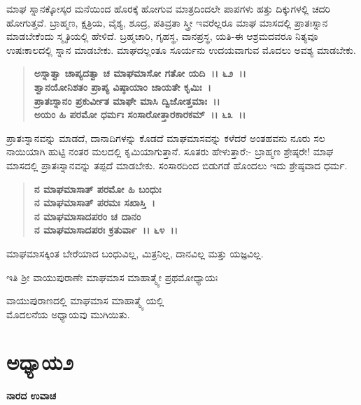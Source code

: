 ಮಾಘ ಸ್ನಾನಕ್ಕೋಸ್ಕರ ಮನೆಯಿಂದ ಹೊರಕ್ಕೆ ಹೋಗುವ ಮಾತ್ರದಿಂದಲೇ ಪಾಪಗಳು ಹತ್ತು ದಿಕ್ಕುಗಳಲ್ಲಿ ಚದರಿ ಹೋಗುತ್ತವೆ. ಬ್ರಾಹ್ಮಣ, ಕ್ಷತ್ರಿಯ, ವೈಶ್ಯ, ಶೂದ್ರ, ಪತಿವ್ರತಾ ಸ್ತ್ರೀ ಇವರೆಲ್ಲರೂ ಮಾಘ ಮಾಸದಲ್ಲಿ ಪ್ರಾತಃಸ್ನಾನ ಮಾಡಬೇಕೆಂದು ಸ್ಮೃತಿಯಲ್ಲಿ ಹೇಳಿದೆ. ಬ್ರಹ್ಮಚಾರಿ, ಗೃಹಸ್ಥ, ವಾನಪ್ರಸ್ಥ, ಯತಿ-ಈ ಆಶ್ರಮದವರೂ ನಿತ್ಯವೂ ಉಷಃಕಾಲದಲ್ಲಿ ಸ್ನಾನ ಮಾಡಬೇಕು. ಮಾಘದಲ್ಲಂತೂ ಸೂರ್ಯನು ಉದಯವಾಗುವ ಮೊದಲು ಅವಶ್ಯ ಮಾಡಬೇಕು.

\begin{verse}
\textbf{ಅಸ್ನಾತ್ವಾ ಚಾಪ್ಯದತ್ವಾ ಚ ಮಾಘಮಾಸೋ ಗತೋ ಯದಿ~।। ೬೨~।।}\\\textbf{ಶ್ವಾನಯೋನಿಶತಂ ಪ್ರಾಪ್ಯ ವಿಷ್ಠಾಯಾಂ ಜಾಯತೇ ಕೃಮಿಃ~।}\\\textbf{ಪ್ರಾತಃಸ್ನಾನಂ ಪ್ರಕುರ್ವೀತ ಮಾಘೇ ಮಾಸಿ ದ್ವಿಜೋತ್ತಮಾಃ~।।} \\\textbf{ಅಯಂ ಹಿ ಪರಮೋ ಧರ್ಮಃ ಸಂಸಾರೋತ್ತಾರಕಾರಕಮ್~।। ೬೩~।।}
\end{verse}

ಪ್ರಾತಃಸ್ನಾನವನ್ನು ಮಾಡದೆ, ದಾನಾದಿಗಳನ್ನು ಕೊಡದೆ ಮಾಘಮಾಸವನ್ನು ಕಳೆದರೆ ಅಂತಹವನು ನೂರು ಸಲ ನಾಯಿಯಾಗಿ ಹುಟ್ಟಿ ನಂತರ ಮಲದಲ್ಲಿ ಕೃಮಿಯಾಗುತ್ತಾನೆ. ಸೂತರು ಹೇಳುತ್ತಾರೆ:- ಬ್ರಾಹ್ಮಣ ಶ್ರೇಷ್ಠರೇ! ಮಾಘ ಮಾಸದಲ್ಲಿ ಪ್ರಾತಃಸ್ನಾನವನ್ನು ತಪ್ಪದೆ ಮಾಡಬೇಕು. ಸಂಸಾರದಿಂದ ಬಿಡುಗಡೆ ಹೊಂದಲು ಇದು ಶ್ರೇಷ್ಠವಾದ ಧರ್ಮ.

\begin{verse}
\textbf{ನ ಮಾಘಮಾಸಾತ್ ಪರಮೋ ಹಿ ಬಂಧುಃ}\\\textbf{ನ ಮಾಘಮಾಸಾತ್ ಪರಮಃ ಸಖಾಸ್ತಿ~।}\\\textbf{ನ ಮಾಘಮಾಸಾದಪರಂ ಚ ದಾನಂ} \\\textbf{ನ ಮಾಘಮಾಸಾದಪರಃ ಕ್ರತುರ್ವಾ~।। ೬೪~।। }
\end{verse}

ಮಾಘಮಾಸಕ್ಕಿಂತ ಬೇರೆಯಾದ ಬಂಧುವಿಲ್ಲ, ಮಿತ್ರನಿಲ್ಲ, ದಾನವಿಲ್ಲ ಮತ್ತು ಯಜ್ಞವಿಲ್ಲ.

\begin{center}
ಇತಿ ಶ‍್ರೀ ವಾಯುಪುರಾಣೇ ಮಾಘಮಾಸ ಮಾಹಾತ್ಮ್ಯೇ ಪ್ರಥಮೋಧ್ಯಾಯಃ
\end{center}

\begin{center}
ವಾಯುಪುರಾಣದಲ್ಲಿ ಮಾಘಮಾಸ ಮಾಹಾತ್ಮ್ಯೆ ಯಲ್ಲಿ \\ ಮೊದಲನೆಯ ಅಧ್ಯಾಯವು ಮುಗಿಯಿತು.
\end{center}

\newpage

\section*{ಅಧ್ಯಾಯ\enginline{-}೨}

\emptypage

\begin{flushleft}
\textbf{ನಾರದ ಉವಾಚ\enginline{-}}
\end{flushleft}

